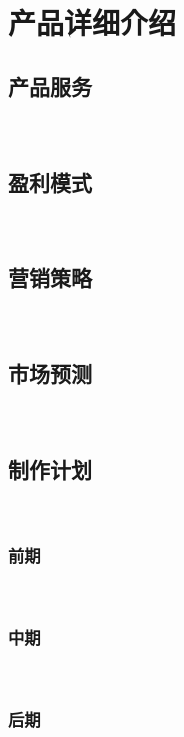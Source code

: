 \section{产品详细介绍}%
\subsection{产品服务}\ 


\subsection{盈利模式}\ 


\subsection{营销策略}\ 


\subsection{市场预测}\ 


\subsection{制作计划}\ %

\subsubsection{前期}\ %


\subsubsection{中期}\ %


\subsubsection{后期}\ %
